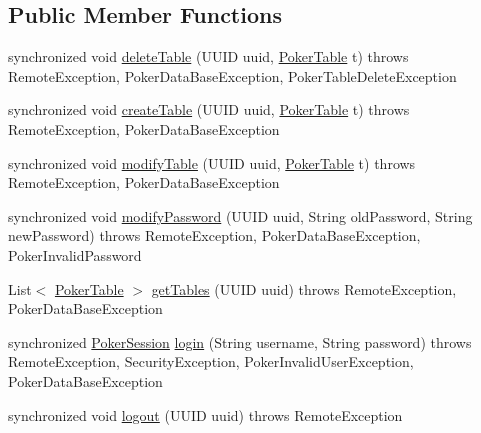 \subsection*{Public Member Functions}
\begin{DoxyCompactItemize}
\item 
synchronized void \hyperlink{classhu_1_1elte_1_1bfw1p6_1_1poker_1_1server_1_1_poker_remote_impl_a9f6e4f1eb8d2a4d2b725a104f0efdba6}{delete\+Table} (U\+U\+I\+D uuid, \hyperlink{classhu_1_1elte_1_1bfw1p6_1_1poker_1_1model_1_1entity_1_1_poker_table}{Poker\+Table} t)  throws Remote\+Exception, Poker\+Data\+Base\+Exception, Poker\+Table\+Delete\+Exception 
\item 
synchronized void \hyperlink{classhu_1_1elte_1_1bfw1p6_1_1poker_1_1server_1_1_poker_remote_impl_a7a07fc2aeacdfa0f2f3dfda1822f5627}{create\+Table} (U\+U\+I\+D uuid, \hyperlink{classhu_1_1elte_1_1bfw1p6_1_1poker_1_1model_1_1entity_1_1_poker_table}{Poker\+Table} t)  throws Remote\+Exception, Poker\+Data\+Base\+Exception 
\item 
synchronized void \hyperlink{classhu_1_1elte_1_1bfw1p6_1_1poker_1_1server_1_1_poker_remote_impl_a2e620afb73cf7a700f8b6ee5d42be60f}{modify\+Table} (U\+U\+I\+D uuid, \hyperlink{classhu_1_1elte_1_1bfw1p6_1_1poker_1_1model_1_1entity_1_1_poker_table}{Poker\+Table} t)  throws Remote\+Exception, Poker\+Data\+Base\+Exception 
\item 
synchronized void \hyperlink{classhu_1_1elte_1_1bfw1p6_1_1poker_1_1server_1_1_poker_remote_impl_a06f5679523eb441e40af6c020275e679}{modify\+Password} (U\+U\+I\+D uuid, String old\+Password, String new\+Password)  throws Remote\+Exception, Poker\+Data\+Base\+Exception, Poker\+Invalid\+Password 
\item 
List$<$ \hyperlink{classhu_1_1elte_1_1bfw1p6_1_1poker_1_1model_1_1entity_1_1_poker_table}{Poker\+Table} $>$ \hyperlink{classhu_1_1elte_1_1bfw1p6_1_1poker_1_1server_1_1_poker_remote_impl_a73fd53dd9445adefabe7dbb986a8158e}{get\+Tables} (U\+U\+I\+D uuid)  throws Remote\+Exception, Poker\+Data\+Base\+Exception 
\item 
synchronized \hyperlink{classhu_1_1elte_1_1bfw1p6_1_1poker_1_1model_1_1_poker_session}{Poker\+Session} \hyperlink{classhu_1_1elte_1_1bfw1p6_1_1poker_1_1server_1_1_poker_remote_impl_a537a64e08430f0c21e722b5f170c574d}{login} (String username, String password)  throws Remote\+Exception, Security\+Exception, Poker\+Invalid\+User\+Exception, Poker\+Data\+Base\+Exception 
\item 
synchronized void \hyperlink{classhu_1_1elte_1_1bfw1p6_1_1poker_1_1server_1_1_poker_remote_impl_a07ceb6650ddc01da67aba54816f915c2}{logout} (U\+U\+I\+D uuid)  throws Remote\+Exception 

\end{DoxyCompactItemize}
